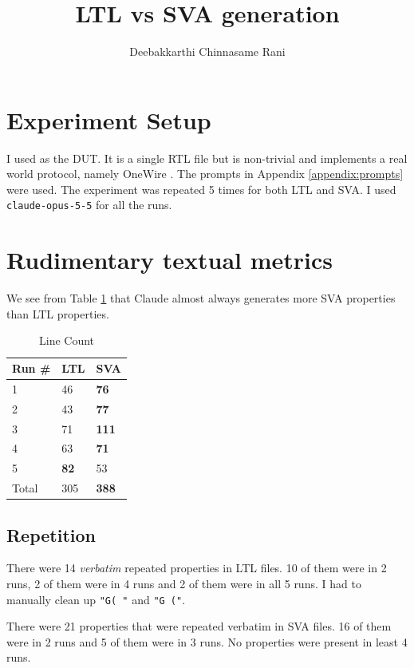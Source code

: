 \documentclass[letterpaper, 12pt]{article}
\title{LTL vs SVA generation}
\author{Deebakkarthi Chinnasame Rani}
\begin{document}
\maketitle
\thispagestyle{fancy}

\section{Experiment Setup}
I used \cite{sockit} as the DUT. It is a single RTL file but is non-trivial
and implements a real world protocol, namely OneWire \cite{onewire}. The prompts in
Appendix \ref{appendix:prompts} were used. The experiment was repeated 5 times
for both LTL and SVA. I used \texttt{claude-opus-5-5} for all the runs. 

\section{Rudimentary textual metrics}

We see from Table \ref{tab:line_count} that Claude almost always generates more SVA
properties than LTL properties.
\begin{table}[H]
\centering
\begin{tabular}{@{}lll@{}}
\toprule
Run \# & LTL & SVA \\ \midrule
	1      & 46 & \textbf{76}  \\ \midrule
	2      & 43 & \textbf{77}  \\ \midrule
	3      & 71 & \textbf{111}  \\ \midrule
	4      & 63 & \textbf{71}  \\ \midrule
	5      & \textbf{82} & 53  \\ \midrule
Total & 305 & \textbf{388} \\ \bottomrule
\end{tabular}
\caption{Line Count}
\label{tab:line_count}
\end{table}

\subsection{Repetition}
There were 14 \textit{verbatim} repeated properties in LTL files. 10 of them
were in 2 runs, 2 of them were in 4 runs and 2 of them were in all 5 runs.
I had to manually clean up \texttt{"G( "} and \texttt{"G ("}.

There were 21 properties that were repeated verbatim in SVA files. 16 of them
were in 2 runs and 5 of them were in 3 runs. No properties were present in
least 4 runs.
\end{document}

